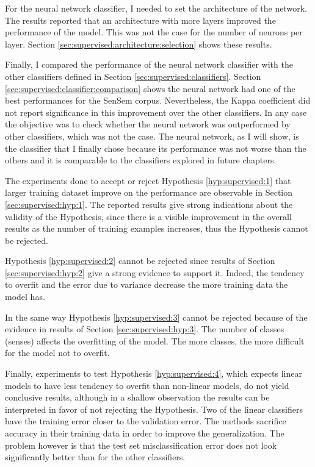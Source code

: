 For the neural network classifier, I needed to set the architecture of the
network. The results reported that an architecture with more layers improved
the performance of the model. This was not the case for the number
of neurons per layer. Section \ref{sec:supervised:architecture:selection} shows
these results.

Finally, I compared the performance of the neural network classifier with the
other classifiers defined in Section \ref{sec:supervised:classifiers}. Section
\ref{sec:supervised:classifier:comparison} shows the neural network had one of
the best performances for the SenSem corpus. Nevertheless, the Kappa
coefficient did not report significance in this improvement over the other
classifiers. In any case the objective was to check whether the neural network
was outperformed by other classifiers, which was not the case. The neural
network, as I will show, is the classifier that I finally chose because its
performance was not worse than the others and it is comparable to the
classifiers explored in future chapters.

The experiments done to accept or reject Hypothesis \ref{hyp:supervised:1} that
larger training dataset improve on the performance are observable in Section
\ref{sec:supervised:hyp:1}. The reported results give strong indications about
the validity of the Hypothesis, since there is a visible improvement in the
overall results as the number of training examples increases, thus the
Hypothesis cannot be rejected.

Hypothesis \ref{hyp:supervised:2} cannot be rejected since results of Section
\ref{sec:supervised:hyp:2} give a strong evidence to support it. Indeed,
the tendency to overfit and the error due to variance decrease the more
training data the model has.

In the same way Hypothesis \ref{hyp:supervised:3} cannot be rejected because of
the evidence in results of Section \ref{sec:supervised:hyp:3}. The number of
classes (senses) affects the overfitting of the model. The more classes, the
more difficult for the model not to overfit.

Finally, experiments to test Hypothesis \ref{hyp:supervised:4}, which expects
linear models to have less tendency to overfit than non-linear models, do not
yield conclusive results, although in a shallow observation the results can be
interpreted in favor of not rejecting the Hypothesis. Two of the linear
classifiers have the training error closer to the validation error. The methods
sacrifice accuracy in their training data in order to improve the
generalization. The problem however is that the test set misclassification
error does not look significantly better than for the other classifiers.

